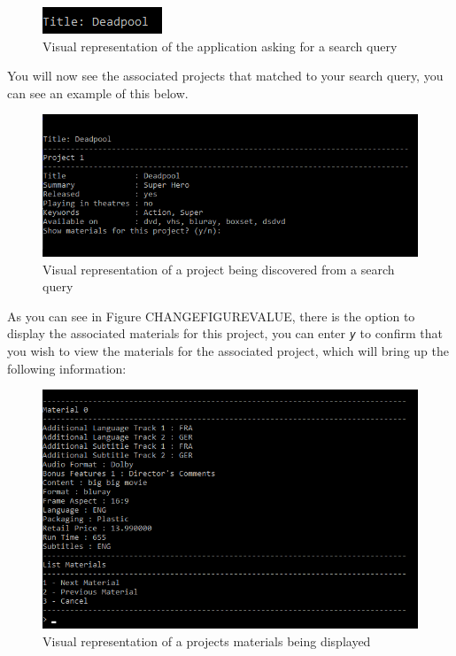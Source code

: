 \documentclass[
  english,
  a4paper,
,tablecaptionabove
]{scrartcl}
\begin{document}
\begin{figure}
\centering
\includegraphics{images/user-guide/view-mode/project-title-search.png}
\caption{Visual representation of the application asking for a search
query}
\end{figure}

You will now see the associated projects that matched to your search
query, you can see an example of this below.

\begin{figure}
\centering
\includegraphics{images/user-guide/view-mode/project-search-term.png}
\caption{Visual representation of a project being discovered from a
search query}
\end{figure}

As you can see in Figure CHANGEFIGUREVALUE, there is the option to
display the associated materials for this project, you can enter
\emph{\texttt{y}} to confirm that you wish to view the materials for the
associated project, which will bring up the following information:

\begin{figure}
\centering
\includegraphics{images/user-guide/view-mode/project-search-list-material.png}
\caption{Visual representation of a projects materials being displayed}
\end{figure}
\end{document}
